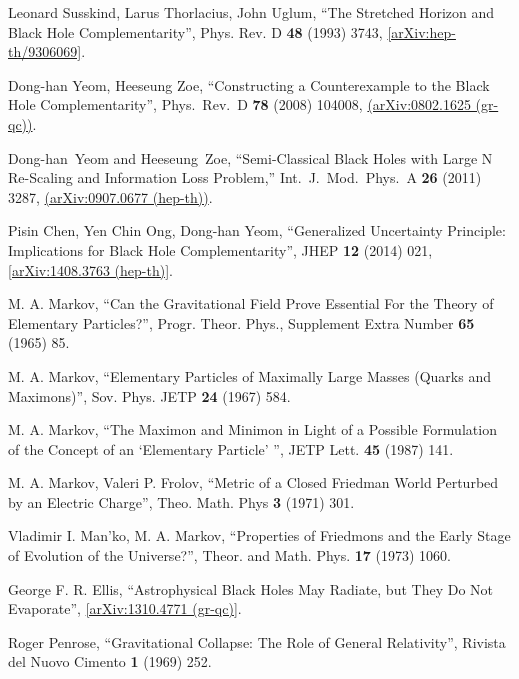 \documentclass[12pt]{article}
\newcommand{\2}{$^2$}
\newcommand{\3}{$^3$}
\newcommand{\4}{$_4$}
\newcommand{\5}{$_5$}
\begin{document}
\begin{thebibliography}{400}
Leonard Susskind, Larus Thorlacius, John Uglum, ``The Stretched Horizon and Black Hole Complementarity'', Phys. Rev. D \textbf{48} (1993) 3743, \href{http://arxiv.org/abs/hep-th/9306069}{[arXiv:hep-th/9306069]}.

  Dong-han Yeom, Heeseung Zoe,
  ``Constructing a Counterexample to the Black Hole Complementarity'',
  Phys.\ Rev.\  D {\bf 78} (2008) 104008, \href{http://arxiv.org/abs/0802.1625}{
 (arXiv:0802.1625 (gr-qc))}.

	Dong-han~Yeom and Heeseung~Zoe,
  ``Semi-Classical Black Holes with Large N Re-Scaling and Information Loss Problem,''
  Int.\ J.\ Mod.\ Phys.\ A {\bf 26} (2011) 3287, \href{http://arxiv.org/abs/0907.0677}{
  (arXiv:0907.0677 (hep-th))}.
  
Pisin Chen, Yen Chin Ong, Dong-han Yeom, ``Generalized Uncertainty Principle: Implications for Black Hole Complementarity'', JHEP \textbf{12} (2014) 021, \href{http://arxiv.org/abs/1408.3763}{[arXiv:1408.3763 (hep-th)]}.



  M. A. Markov, ``Can the Gravitational Field Prove Essential For the Theory of
Elementary Particles?'', Progr. Theor. Phys., Supplement Extra Number \textbf{65} (1965) 85.

M. A. Markov, ``Elementary Particles of Maximally Large Masses (Quarks and Maximons)'', Sov. Phys. JETP \textbf{24} (1967) 584. 

M. A. Markov, ``The Maximon and Minimon in Light of a Possible Formulation of the Concept of an `Elementary Particle' '', JETP Lett. \textbf{45} (1987) 141.

M. A. Markov, Valeri P. Frolov, ``Metric of a Closed Friedman World Perturbed by an Electric Charge'', Theo. Math. Phys \textbf{3} (1971) 301.

Vladimir I. Man'ko, M. A. Markov, ``Properties of Friedmons and the Early Stage of Evolution of the Universe?'', Theor. and Math. Phys. \textbf{17} (1973) 1060.





George F. R. Ellis, ``Astrophysical Black Holes May Radiate, but They Do Not Evaporate'', \href{http://arxiv.org/abs/1310.4771}{[arXiv:1310.4771 (gr-qc)]}.

Roger Penrose, ``Gravitational Collapse: The Role of General Relativity'', Rivista del Nuovo Cimento \textbf{1} (1969) 252.


\end{thebibliography}
\end{document}
